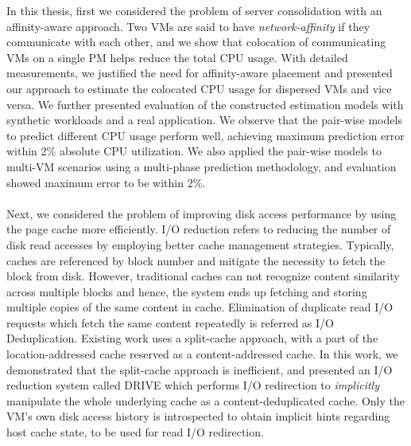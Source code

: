 In this thesis, first we considered the problem of 
server consolidation with an affinity-aware approach. Two VMs are 
said to have \textit{network-affinity} if they 
communicate with each other, and we show that colocation
of communicating VMs on a single PM helps reduce the total CPU usage.
With detailed measurements, we justified the need for
affinity-aware placement and presented our approach to estimate
the colocated CPU usage for dispersed VMs and vice versa. We 
further presented evaluation
of the constructed estimation models with synthetic workloads
and a real application. We observe that the pair-wise models
to predict different CPU usage 
perform well, achieving maximum prediction
error within 2\% absolute CPU utilization. We also applied
the pair-wise models to multi-VM scenarios using a multi-phase
prediction methodology, and evaluation showed maximum
error to be within 2\%.
\\
\\
Next, we considered the problem of improving disk access performance
by using the page cache more efficiently. 
I/O reduction refers to reducing the number of disk read accesses by
employing better cache management strategies. Typically, caches are
referenced by block number and mitigate the necessity to fetch the block
from disk. However, traditional caches can not recognize content similarity
across multiple blocks and hence, the system ends up fetching and storing
multiple copies of the same content in cache.
Elimination of duplicate read I/O requests which fetch the same
content repeatedly is referred as I/O Deduplication.
Existing work uses a split-cache approach, with a part of the location-addressed
cache reserved as a content-addressed cache. In this work, we demonstrated
that the split-cache approach is inefficient, and presented an
I/O reduction system called DRIVE which performs I/O
redirection to \textit{implicitly} manipulate the whole underlying cache as
a content-deduplicated cache. Only the VM's own disk access history is
introspected to obtain implicit hints regarding host cache state, to be used
for read I/O redirection.

